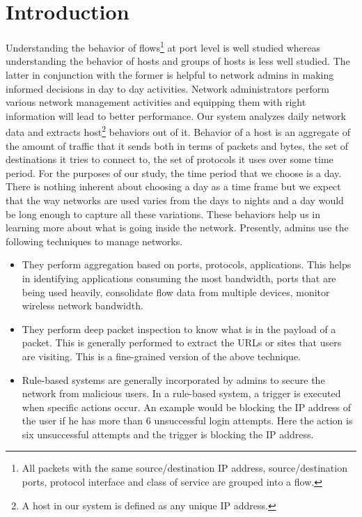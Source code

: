 
\chapter{Introduction}

Understanding the behavior of flows\footnote{All packets with the same source/destination IP address, source/destination ports, protocol interface and class of service are grouped into a flow.} at port level is well studied whereas understanding the behavior of hosts and groups of hosts is less well studied. The latter in conjunction with the former is helpful to network admins in making informed decisions in day to day activities. Network administrators perform various network management activities and equipping them with right information will lead to better performance. 
Our system analyzes daily network data and extracts host\footnote{A host in our system is defined as any unique IP address.} behaviors out of it.  Behavior of a host is an aggregate of the amount of traffic that it sends both in terms of packets and bytes, the set of destinations it tries to connect to, the set of protocols it uses over some time period. For the purposes of our study, the time period that we choose is a day. There is nothing inherent about choosing a day as a time frame but we expect that the way networks are used varies from the days to nights and a day would be long enough to capture all these variations. These behaviors help us in learning more about what is going inside the network. Presently, admins use the following techniques to manage networks. 
\begin{itemize}
	\item They perform aggregation based on ports, protocols, applications. This helps in identifying applications consuming the most bandwidth, ports that are being used heavily, consolidate flow data from multiple devices, monitor wireless network bandwidth.	
	\item They perform deep packet inspection to know what is in the payload of a packet. This is generally performed to extract the URLs or sites that users are  visiting. This is a fine-grained version of the above technique.	
	\item Rule-based systems are generally incorporated by admins to secure the network from malicious users. In a rule-based system, a trigger is executed when specific actions occur. An example would be blocking the IP address of the user if he has more than 6 unsuccessful login attempts. Here the action is six unsuccessful attempts and the trigger is blocking the IP address. 
\end{itemize}

